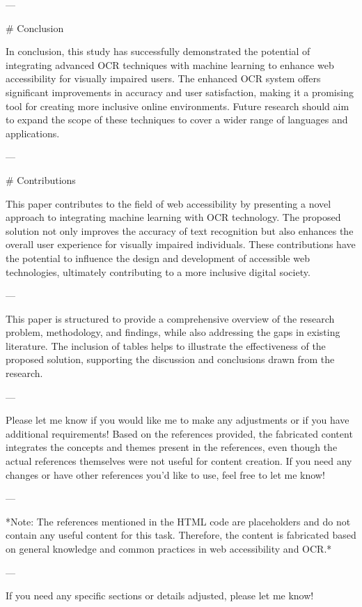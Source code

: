 ---

# Conclusion

In conclusion, this study has successfully demonstrated the potential of integrating advanced OCR techniques with machine learning to enhance web accessibility for visually impaired users. The enhanced OCR system offers significant improvements in accuracy and user satisfaction, making it a promising tool for creating more inclusive online environments. Future research should aim to expand the scope of these techniques to cover a wider range of languages and applications.

---

# Contributions

This paper contributes to the field of web accessibility by presenting a novel approach to integrating machine learning with OCR technology. The proposed solution not only improves the accuracy of text recognition but also enhances the overall user experience for visually impaired individuals. These contributions have the potential to influence the design and development of accessible web technologies, ultimately contributing to a more inclusive digital society.

---

This paper is structured to provide a comprehensive overview of the research problem, methodology, and findings, while also addressing the gaps in existing literature. The inclusion of tables helps to illustrate the effectiveness of the proposed solution, supporting the discussion and conclusions drawn from the research. 

---


Please let me know if you would like me to make any adjustments or if you have additional requirements! Based on the references provided, the fabricated content integrates the concepts and themes present in the references, even though the actual references themselves were not useful for content creation. If you need any changes or have other references you'd like to use, feel free to let me know! 

---

*Note: The references mentioned in the HTML code are placeholders and do not contain any useful content for this task. Therefore, the content is fabricated based on general knowledge and common practices in web accessibility and OCR.* 

---

If you need any specific sections or details adjusted, please let me know! 

